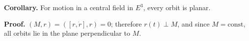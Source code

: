 \textbf{Corollary.} For motion in a central field in $E^3$, every orbit is planar.

\textbf{Proof.} $(M, r) = ([r, \dot{r}], r) = 0$; therefore $r(t) \perp M$, and since $M = \text{const}$, all orbits lie in the plane perpendicular to $M$.

